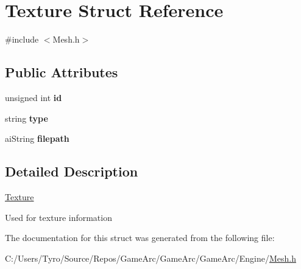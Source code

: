 \hypertarget{struct_texture}{}\section{Texture Struct Reference}
\label{struct_texture}


{\ttfamily \#include $<$Mesh.\+h$>$}

\subsection*{Public Attributes}
\begin{DoxyCompactItemize}
\item 
\mbox{\label{struct_texture_aed42161a5c00b6020c85833401da6da6}} 
unsigned int {\bfseries id}
\item 
\mbox{\label{struct_texture_adacb495ed5140ec76a09cd130e7d5c32}} 
string {\bfseries type}
\item 
\mbox{\label{struct_texture_a69c8def64c608063b2ecb7fd785121ee}} 
ai\+String {\bfseries filepath}
\end{DoxyCompactItemize}


\subsection{Detailed Description}
\mbox{\hyperlink{struct_texture}{Texture}}

Used for texture information 

The documentation for this struct was generated from the following file\+:\begin{DoxyCompactItemize}
\item 
C\+:/\+Users/\+Tyro/\+Source/\+Repos/\+Game\+Arc/\+Game\+Arc/\+Game\+Arc/\+Engine/\mbox{\hyperlink{_mesh_8h}{Mesh.\+h}}\end{DoxyCompactItemize}
